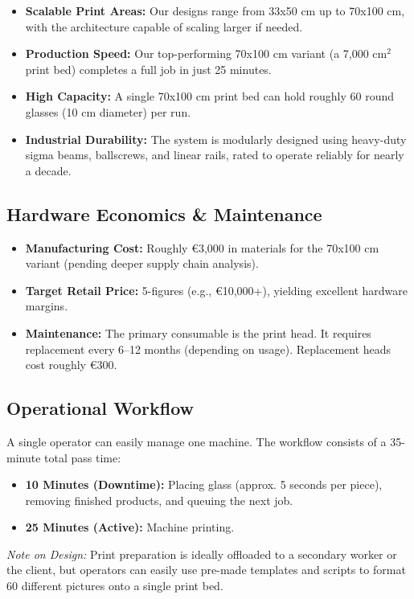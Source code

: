 \documentclass[11pt, a4paper]{article}
\begin{document}
\begin{itemize}
	\item \textbf{Scalable Print Areas:} Our designs range from 33x50 cm
		up to 70x100 cm, with the architecture capable of scaling larger if needed.
	\item \textbf{Production Speed:} Our top-performing 70x100 cm
		variant (a 7,000 cm$^2$ print bed) completes a full job in just 25 minutes.
	\item \textbf{High Capacity:} A single 70x100 cm print bed can hold
		roughly 60 round glasses (10 cm diameter) per run.
	\item \textbf{Industrial Durability:} The system is modularly
		designed using heavy-duty sigma beams, ballscrews, and linear
		rails, rated to operate reliably for nearly a decade.
\end{itemize}

\subsection*{Hardware Economics \& Maintenance}
\begin{itemize}
	\item \textbf{Manufacturing Cost:} Roughly €3,000 in materials for
		the 70x100 cm variant (pending deeper supply chain analysis).
	\item \textbf{Target Retail Price:} 5-figures (e.g., €10,000+),
		yielding excellent hardware margins.
	\item \textbf{Maintenance:} The primary consumable is the print
		head. It requires replacement every 6–12 months (depending on
		usage). Replacement heads cost roughly €300.
\end{itemize}

\subsection*{Operational Workflow}
A single operator can easily manage one machine. The workflow
consists of a 35-minute total pass time:

\begin{itemize}
	\item \textbf{10 Minutes (Downtime):} Placing glass (approx. 5
		seconds per piece), removing finished products, and queuing the next job.
	\item \textbf{25 Minutes (Active):} Machine printing.
\end{itemize}

\textit{Note on Design:} Print preparation is ideally offloaded to a
secondary worker or the client, but operators can easily use pre-made
templates and scripts to format 60 different pictures onto a single print bed.
\end{document}
